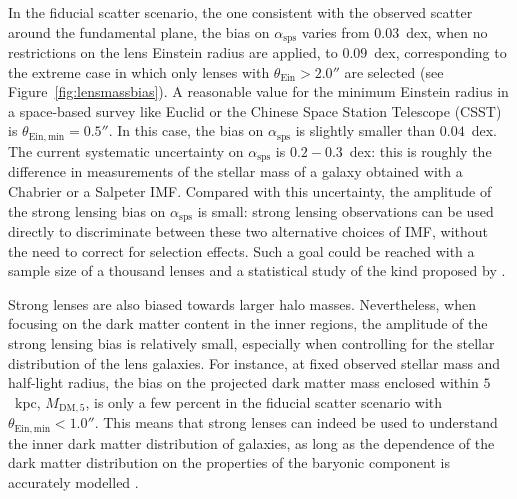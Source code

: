 \documentclass{aa}
\def\asps{\alpha_{\mathrm{sps}}}
\def\mdmfive{M_{\mathrm{DM}, 5}}
\def\tein{\theta_{\mathrm{Ein}}}
\def\Fref#1{Figure~\ref{#1}\xspace}
\begin{document}
In the fiducial scatter scenario, the one consistent with the observed scatter around the fundamental plane, the bias on $\asps$ varies from $0.03$~dex, when no restrictions on the lens Einstein radius are applied, to $0.09$~dex, corresponding to the extreme case in which only lenses with $\tein > 2.0''$ are selected (see \Fref{fig:lensmassbias}).
A reasonable value for the minimum Einstein radius in a space-based survey like Euclid or the Chinese Space Station Telescope (CSST) is $\theta_{\mathrm{Ein,min}}=0.5''$. In this case, the bias on $\asps$ is slightly smaller than $0.04$~dex.
The current systematic uncertainty on $\asps$ is $0.2-0.3$~dex: this is roughly the difference in measurements of the stellar mass of a galaxy obtained with a Chabrier or a Salpeter IMF.
Compared with this uncertainty, the amplitude of the strong lensing bias on $\asps$ is small: strong lensing observations can be used directly to discriminate between these two alternative choices of IMF, without the need to correct for selection effects. 
Such a goal could be reached with a sample size of a thousand lenses and a statistical study of the kind proposed by \citet{S+C21}.

Strong lenses are also biased towards larger halo masses.
Nevertheless, when focusing on the dark matter content in the inner regions, the amplitude of the strong lensing bias is relatively small, especially when controlling for the stellar distribution of the lens galaxies.
For instance, at fixed observed stellar mass and half-light radius, the bias on the projected dark matter mass enclosed within $5$~kpc, $\mdmfive$, is only a few percent in the fiducial scatter scenario with $\theta_{\mathrm{Ein,min}} < 1.0''$.
This means that strong lenses can indeed be used to understand the inner dark matter distribution of galaxies, as long as the dependence of the dark matter distribution on the properties of the baryonic component is accurately modelled \citep[for example, by following the approach of][]{S+C21}.
\end{document}
